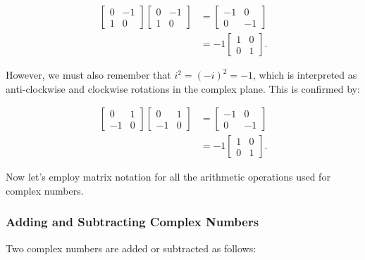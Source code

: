 \documentclass[10pt]{article}
\begin{document}
$$
\begin{aligned}
{\left[\begin{array}{cc}
0 & -1 \\
1 & 0
\end{array}\right]\left[\begin{array}{cc}
0 & -1 \\
1 & 0
\end{array}\right] } & =\left[\begin{array}{cc}
-1 & 0 \\
0 & -1
\end{array}\right] \\
& =-1\left[\begin{array}{ll}
1 & 0 \\
0 & 1
\end{array}\right] .
\end{aligned}
$$

However, we must also remember that $i^{2}=(-i)^{2}=-1$, which is interpreted as anti-clockwise and clockwise rotations in the complex plane. This is confirmed by:

$$
\begin{aligned}
{\left[\begin{array}{cc}
0 & 1 \\
-1 & 0
\end{array}\right]\left[\begin{array}{cc}
0 & 1 \\
-1 & 0
\end{array}\right] } & =\left[\begin{array}{cc}
-1 & 0 \\
0 & -1
\end{array}\right] \\
& =-1\left[\begin{array}{ll}
1 & 0 \\
0 & 1
\end{array}\right] .
\end{aligned}
$$

Now let's employ matrix notation for all the arithmetic operations used for complex numbers.

\subsubsection{Adding and Subtracting Complex Numbers}
Two complex numbers are added or subtracted as follows:
\end{document}
